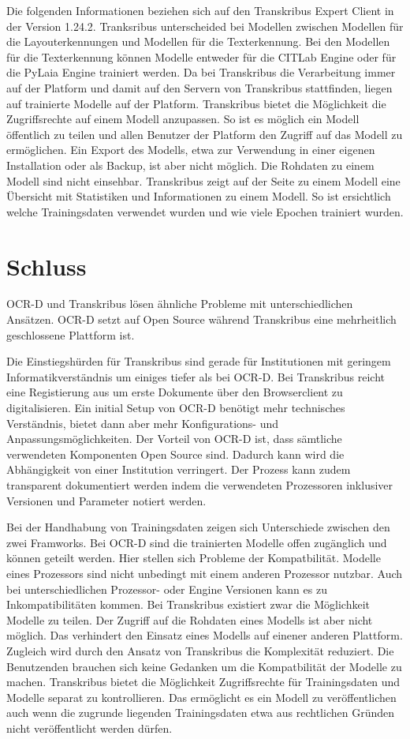 \documentclass[a4paper,oneside, 12pt]{report}
\begin{document}
Die folgenden Informationen beziehen sich auf den Transkribus Expert Client in der Version 1.24.2. Tranksribus unterscheided bei Modellen zwischen Modellen für die Layouterkennungen und Modellen für die Texterkennung. Bei den Modellen für die Texterkennung können Modelle entweder für die CITLab Engine oder für die PyLaia Engine trainiert werden. Da bei Transkribus die Verarbeitung immer auf der Platform und damit auf den Servern von Transkribus stattfinden, liegen auf trainierte Modelle auf der Platform. Transkribus bietet die Möglichkeit die Zugriffsrechte auf einem Modell anzupassen. So ist es möglich ein Modell öffentlich zu teilen und allen Benutzer der Platform den Zugriff auf das Modell zu ermöglichen. Ein Export des Modells, etwa zur Verwendung in einer eigenen Installation oder als Backup, ist aber nicht möglich. Die Rohdaten zu einem Modell sind nicht einsehbar. Transkribus zeigt auf der Seite zu einem Modell eine Übersicht mit Statistiken und Informationen zu einem Modell. So ist ersichtlich welche Trainingsdaten verwendet wurden und wie viele Epochen trainiert wurden.

\chapter{Schluss}\label{sec:schluss}
OCR-D und Transkribus lösen ähnliche Probleme mit unterschiedlichen Ansätzen. OCR-D setzt auf Open Source während Transkribus eine mehrheitlich geschlossene Plattform ist.

Die Einstiegshürden für Transkribus sind gerade für Institutionen mit geringem Informatikverständnis um einiges tiefer als bei OCR-D. Bei Transkribus reicht eine Registierung aus um erste Dokumente über den Browserclient zu digitalisieren. 
Ein initial Setup von OCR-D benötigt mehr technisches Verständnis, bietet dann aber mehr Konfigurations- und Anpassungsmöglichkeiten. Der Vorteil von OCR-D ist, dass sämtliche verwendeten Komponenten Open Source sind. Dadurch kann wird die Abhängigkeit von einer Institution verringert. Der Prozess kann zudem transparent dokumentiert werden indem die verwendeten Prozessoren inklusiver Versionen und Parameter notiert werden. 

Bei der Handhabung von Trainingsdaten zeigen sich Unterschiede zwischen den zwei Framworks. Bei OCR-D sind die trainierten Modelle offen zugänglich und können geteilt werden. Hier stellen sich Probleme der Kompatbilität. Modelle eines Prozessors sind nicht unbedingt mit einem anderen Prozessor nutzbar. Auch bei unterschiedlichen Prozessor- oder Engine Versionen kann es zu Inkompatibilitäten kommen. Bei Transkribus existiert zwar die Möglichkeit Modelle zu teilen. Der Zugriff auf die Rohdaten eines Modells ist aber nicht möglich. Das verhindert den Einsatz eines Modells auf einener anderen Plattform. Zugleich wird durch den Ansatz von Transkribus die Komplexität reduziert. Die Benutzenden brauchen sich keine Gedanken um die Kompatbilität der Modelle zu machen. Transkribus bietet die Möglichkeit Zugriffsrechte für Trainingsdaten und Modelle separat zu kontrollieren. Das ermöglicht es ein Modell zu veröffentlichen auch wenn die zugrunde liegenden Trainingsdaten etwa aus rechtlichen Gründen nicht veröffentlicht werden dürfen.
\end{document}

